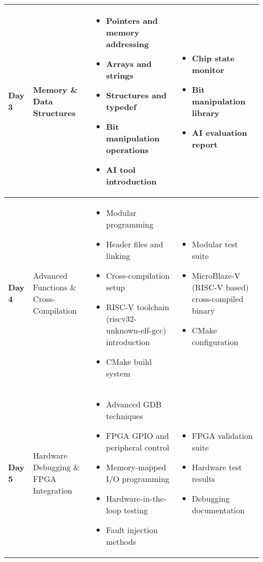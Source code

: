 \documentclass[11pt,a4paper]{article}
\begin{document}
\begin{longtable}{|p{1.5cm}|p{4cm}|p{6cm}|p{3cm}|}
\textbf{Day 3} & Memory \& Data Structures &
\begin{itemize}[nosep]
    \item Pointers and memory addressing
    \item Arrays and strings
    \item Structures and typedef
    \item Bit manipulation operations
    \item AI tool introduction
\end{itemize} &
\begin{itemize}[nosep]
    \item Chip state monitor
    \item Bit manipulation library
    \item AI evaluation report
\end{itemize} \\
\hline

\textbf{Day 4} & Advanced Functions \& Cross-Compilation &
\begin{itemize}[nosep]
    \item Modular programming
    \item Header files and linking
    \item Cross-compilation setup
    \item RISC-V toolchain (riscv32-unknown-elf-gcc) introduction
    \item CMake build system
\end{itemize} &
\begin{itemize}[nosep]
    \item Modular test suite
    \item MicroBlaze-V (RISC-V based) cross-compiled binary
    \item CMake configuration
\end{itemize} \\
\hline

\textbf{Day 5} & Hardware Debugging \& FPGA Integration &
\begin{itemize}[nosep]
    \item Advanced GDB techniques
    \item FPGA GPIO and peripheral control
    \item Memory-mapped I/O programming
    \item Hardware-in-the-loop testing
    \item Fault injection methods
\end{itemize} &
\begin{itemize}[nosep]
    \item FPGA validation suite
    \item Hardware test results
    \item Debugging documentation
\end{itemize} \\
\hline


\end{longtable}
\end{document}
